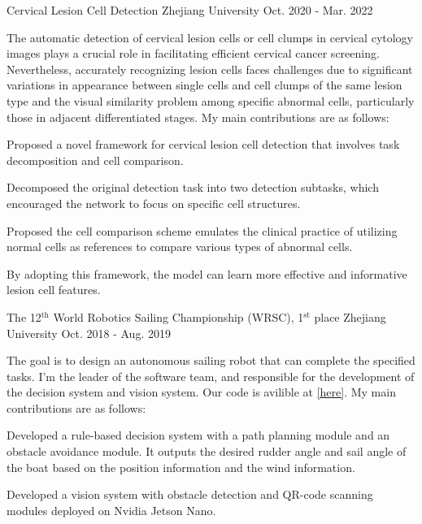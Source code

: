 \begin{cventries}
	\cventry
	{} %
	{Cervical Lesion Cell Detection} %
	{Zhejiang University} %
	{Oct. 2020 - Mar. 2022} %
	{
		\quad The automatic detection of cervical lesion cells or cell clumps in cervical cytology images plays a crucial role in facilitating efficient cervical cancer screening. Nevertheless, accurately recognizing lesion cells faces challenges due to significant variations in appearance between single cells and cell clumps of the same lesion type and the visual similarity problem among specific abnormal cells, particularly those in adjacent differentiated stages. \newline
		My main contributions are as follows: \newline
		\vspace{3.5mm}
		\begin{cvitems} %
			\item{Proposed a novel framework for cervical lesion cell detection that involves task decomposition and cell comparison.}
			\item{Decomposed the original detection task into two detection subtasks, which encouraged the network to focus on specific cell structures.}
			\item{Proposed the cell comparison scheme emulates the clinical practice of utilizing normal cells as references to compare various types of abnormal cells.}
			\item{By adopting this framework, the model can learn more effective and informative lesion cell features.}
		\end{cvitems}
	}

	\cventry
	{} %
	{The 12$^\text{th}$ World Robotics Sailing Championship (WRSC), 1$^\text{st}$ place} %
	{Zhejiang University} %
	{Oct. 2018 - Aug. 2019} %
	{
		\quad The goal is to design an autonomous sailing robot that can complete the specified tasks. I'm the leader of the software team, and responsible for the development of the decision system and vision system. Our code is avilible at \href{https://github.com/ZMART-Sailing/sailing_robot}{\textcolor{link}{[here]}}.\newline
		My main contributions are as follows: \newline
		\vspace{3.5mm}
		\begin{cvitems} %
			\item{Developed a rule-based decision system with a path planning module and an obstacle avoidance module. It outputs the desired rudder angle and sail angle of the boat based on the position information and the wind information.}
			\item{Developed a vision system with obstacle detection and QR-code scanning modules deployed on Nvidia Jetson Nano.}
		\end{cvitems}
	}


\end{cventries}
